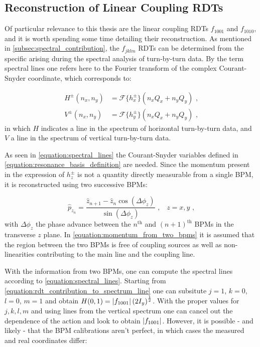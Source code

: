 \subsection{Reconstruction of Linear Coupling RDTs}
\label{subsection:reconstruction_linear_coupling_rdts}

Of particular relevance to this thesis are the linear coupling \glspl{RDT} \(f_{1001}\) and \(f_{1010}\), and it is worth spending some time detailing their reconstruction.
As mentioned in \cref{subsec:spectral_contribution}, the \(f_{jklm}\) RDTs can be determined from the specific  arising during the spectral analysis of turn-by-turn data.
By the term spectral lines one refers here to the Fourier transform of the complex Courant-Snyder coordinate, which corresponds to:

\begin{equation}
  \begin{aligned}
    H^\pm(n_x, n_y) &= \mathcal{F}\{h_x^\pm\}(n_x Q_x + n_y Q_y)  \text{ ,}  \\
    V^\pm(n_x, n_y) &= \mathcal{F}\{h_y^\pm\}(n_x Q_x + n_y Q_y)  \text{ ,}
  \end{aligned}
  \label{equation:spectral_lines}
\end{equation}
in which \(H\) indicates a line in the spectrum of horizontal turn-by-turn data, and \(V\) a line in the spectrum of vertical turn-by-turn data.

As seen in \cref{equation:spectral_lines} the Courant-Snyder variables defined in \cref{equation:resonance_basis_definition} are needed.
Since the momentum present in the expression of \(h_z^\pm\) is not a quantity directly measurable from a single BPM, it is reconstructed using two successive BPMs:

\begin{equation}
  \hat{p}_{z_n} = \frac{\hat{z}_{n+1} - \hat{z}_n \cos \left(\Delta \phi_z\right)}{\sin \left(\Delta \phi_z\right)}  \text{ ,} \quad z = x, y \text{ ,}
  \label{equation:momentum_from_two_bpms}
\end{equation}
with \(\Delta \phi_z\) the phase advance between the \(n^{\mathrm{th}}\) and \((n+1)^{\mathrm{th}}\) BPMs in the transverse \(z\) plane.
In \cref{equation:momentum_from_two_bpms} it is assumed that the region between the two BPMs is free of coupling sources as well as non-linearities contributing to the main line and the coupling line.

With the information from two BPMs, one can compute the spectral lines according to \cref{equation:spectral_lines}.
Starting from \cref{equation:rdt_contribution_to_spectrum_line} one can subsitute \(j = 1\), \(k = 0\), \(l = 0\), \(m = 1\) and obtain \(H(0, 1) = \left\lvert f_{1001} \right\rvert \left(2 I_y \right)^{\frac{1}{2}}\).
With the proper values for \(j,k,l,m\) and using lines from the vertical spectrum one can cancel out the dependence of the action and look to obtain \(\left\lvert f_{1001} \right\rvert\).
However, it is possible - and likely - that the BPM calibrations aren't perfect, in which cases the measured and real coordinates differ:

